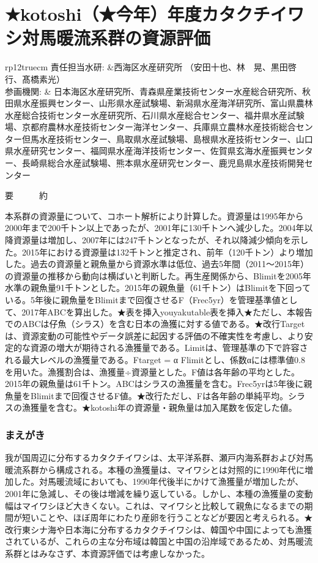 \chapter*{★kotoshi（★今年）年度カタクチイワシ対馬暖流系群の資源評価}

\begin{table}[h]
\begin{tabular}{{rp{12truecm}}}
責任担当水研: &西海区水産研究所 （安田十也、林　晃、黒田啓行、髙橋素光）\\
参画機関: & 日本海区水産研究所、青森県産業技術センター水産総合研究所、秋田県水産振興センター、山形県水産試験場、新潟県水産海洋研究所、富山県農林水産総合技術センター水産研究所、石川県水産総合センター、福井県水産試験場、京都府農林水産技術センター海洋センター、兵庫県立農林水産技術総合センター但馬水産技術センター、鳥取県水産試験場、島根県水産技術センター、山口県水産研究センター、福岡県水産海洋技術センター、佐賀県玄海水産振興センター、長崎県総合水産試験場、熊本県水産研究センター、鹿児島県水産技術開発センター
\end{tabular}
\end{table}

\begin{center}\Large{{\gt 要　　　約}}\end{center}
本系群の資源量について、コホート解析により計算した。資源量は1995年から2000年まで200千トン以上であったが、2001年に130千トンへ減少した。2004年以降資源量は増加し、2007年には247千トンとなったが、それ以降減少傾向を示した。2015年における資源量は132千トンと推定され、前年（120千トン）より増加した。過去の資源量と親魚量から資源水準は低位、過去5年間（2011～2015年）の資源量の推移から動向は横ばいと判断した。再生産関係から、Blimitを2005年水準の親魚量91千トンとした。2015年の親魚量（61千トン）はBlimitを下回っている。5年後に親魚量をBlimitまで回復させるF（Frec5yr）を管理基準値として、2017年ABCを算出した。★表を挿入youyakutable表を挿入★ただし、本報告でのABCは仔魚（シラス）を含む日本の漁獲に対する値である。★改行Targetは、資源変動の可能性やデータ誤差に起因する評価の不確実性を考慮し、より安定的な資源の増大が期待される漁獲量である。Limitは、管理基準の下で許容される最大レベルの漁獲量である。Ftarget = α Flimitとし、係数αには標準値0.8を用いた。漁獲割合は、漁獲量÷資源量とした。F値は各年齢の平均とした。2015年の親魚量は61千トン。ABCはシラスの漁獲量を含む。Frec5yrは5年後に親魚量をBlimitまで回復させるF値。★改行ただし、Fは各年齢の単純平均。シラスの漁獲量を含む。★kotoshi年の資源量・親魚量は加入尾数を仮定した値。

\subsection{まえがき}
我が国周辺に分布するカタクチイワシは、太平洋系群、瀬戸内海系群および対馬暖流系群から構成される。本種の漁獲量は、マイワシとは対照的に1990年代に増加した。対馬暖流域においても、1990年代後半にかけて漁獲量が増加したが、2001年に急減し、その後は増減を繰り返している。しかし、本種の漁獲量の変動幅はマイワシほど大きくない。これは、マイワシと比較して親魚になるまでの期間が短いことや、ほぼ周年にわたり産卵を行うことなどが要因と考えられる。★改行東シナ海や日本海に分布するカタクチイワシは、韓国や中国によっても漁獲されているが、これらの主な分布域は韓国と中国の沿岸域であるため、対馬暖流系群とはみなさず、本資源評価では考慮しなかった。

